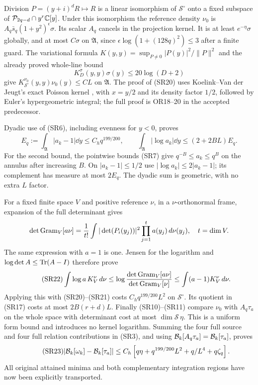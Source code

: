 Division $P=(y+i)^dR\mapsto R$ is a linear isomorphism of $\mathcal S^\circ$
onto a fixed subspace of $\mathcal P_{2q-d}\cap y^r\mathbb C[y]$. Under this isomorphism
the reference density $\nu_0$ is
$A_q\bar s_q(1+y^2)^\epsilon\sigma$. Its scalar $A_q$ cancels in the
projection kernel. It is at least $e^{-\eta}\sigma$ globally, and at most
$C\sigma$ on $\mathfrak A$, since
$\epsilon\log(1+(128q)^2)\le3$ after a finite guard.
The variational formula $K(y,y)=\sup_{P\ne0}|P(y)|^2/\|P\|^2$ and the
already proved whole-line bound
\begin{equation}\tag{SR20}
 K_D^\sigma(y,y)\sigma(y)\le20\log(D+2)
\end{equation}
give $K_{\mathcal S^\circ}^{\nu_0}(y,y)\nu_0(y)\le C L$ on $\mathfrak A$.
The proof of (SR20) uses Koelink--Van der Jeugt's exact Poisson kernel
\cite{a02sr:KVJ}, with $x=y/2$ and its density factor $1/2$, followed by Euler's
hypergeometric integral; the full proof is OR18--20 in the accepted predecessor.

Dyadic use of (SR6), including evenness for $y<0$, proves
\begin{equation}\tag{SR21}
 E_q:=\int_{\mathfrak A}|a_k-1|\dd y\le C_hq^{199/200},\qquad
 \int_{\mathfrak A}|\log a_k|\dd y\le(2+2BL)E_q.
\end{equation}
For the second bound, the pointwise bounds (SR7) give
$q^{-B}\le a_k\le q^B$ on the annulus after increasing $B$.
On $|a_k-1|\le1/2$ use $|\log a_k|\le2|a_k-1|$; its complement has
measure at most $2E_q$. The dyadic sum is geometric, with no extra $L$ factor.

For a fixed finite space $V$ and positive reference $\nu$, in a
$\nu$-orthonormal frame, expansion of the full determinant gives
\[
 \det\operatorname{Gram}_V[a\nu]=\frac1{t!}\int
 |\det(P_i(y_j))|^2\prod_{j=1}^ta(y_j)\,d\nu(y_j),\quad t=\dim V.
\]
The same expression with $a=1$ is one. Jensen for the logarithm and
$\log\det A\le\operatorname{Tr}(A-I)$ therefore prove
\begin{equation}\tag{SR22}
 \int\log a\,K_V^\nu\,d\nu
 \le\log\frac{\det\operatorname{Gram}_V[a\nu]}{\det\operatorname{Gram}_V[\nu]}
 \le\int(a-1)K_V^\nu\,d\nu.
\end{equation}
Applying this with (SR20)--(SR21) costs $C_hq^{199/200}L^2$ on
$\mathcal S^\circ$. Its quotient in (SR17) costs at most $2B(r+d)L$.
Finally (SR10)--(SR11) compare $\nu_0$ with $A_q\tau_a$ on the whole space
with determinant cost at most $\dim\mathcal S\,\eta$. This is a uniform
form bound and introduces no kernel logarithm.
Summing the four full source and four full relation contributions in (SR3),
and using $\mathcal B_k[A_q\tau_a]=\mathcal B_k[\tau_a]$, proves
\begin{equation}\tag{SR23}
 |\mathcal B_k[\omega_k]-\mathcal B_k[\tau_a]|
 \le C_h\left[q\eta+q^{199/200}L^2+q/L^4+q\zeta_q\right].
\end{equation}
All original attained minima and both complementary integration regions have
now been explicitly transported.

